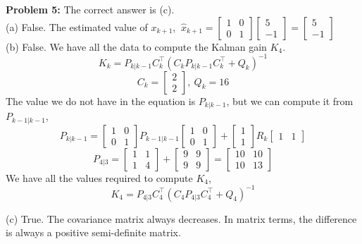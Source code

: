 \documentclass[letterpaper]{article}
\begin{document}
\noindent \textbf{Problem 5:} The correct answer is (c). \\


(a) False. The estimated value of $x_{k+1}$, $~\hat x_{k+1} = \begin{bmatrix} 1 & 0 \\ 0 &1 \end{bmatrix} \begin{bmatrix} 5 \\ -1 \end{bmatrix} = \begin{bmatrix} 5 \\ -1 \end{bmatrix} $\\

(b) False. We have all the data to compute the Kalman gain $K_4$.
$$K_k= P_{k|k-1} C_{k}^\top (C_k P_{k|k-1} C_k^\top + Q_k)^{-1} $$
$$C_k = \begin{bmatrix} 2 \\ 2 \end{bmatrix}, ~ Q_k = 16  $$
The value we do not have in the equation is $P_{k|k-1}$, but we can compute it from $P_{k-1|k-1}$,
$$P_{k|k-1} = \begin{bmatrix} 1 & 0 \\ 0 &1 \end{bmatrix} P_{k-1|k-1} \begin{bmatrix} 1 & 0 \\ 0 &1 \end{bmatrix} + \begin{bmatrix} 1 \\ 1 \end{bmatrix} R_k \begin{bmatrix} 1 & 1 \end{bmatrix}$$
$$P_{4|3} =  \begin{bmatrix} 1 & 1 \\ 1 & 4 \end{bmatrix} + \begin{bmatrix} 9 & 9 \\ 9 &9 \end{bmatrix} = \begin{bmatrix} 10 & 10 \\ 10 & 13 \end{bmatrix}$$
We have all the values required to compute $K_4$,
$$K_4= P_{4|3} C_{4}^\top (C_4 P_{4|3} C_4^\top + Q_4)^{-1} $$



(c) True. The covariance matrix always decreases. In matrix terms, the difference is always a positive semi-definite matrix.\\
\end{document}
